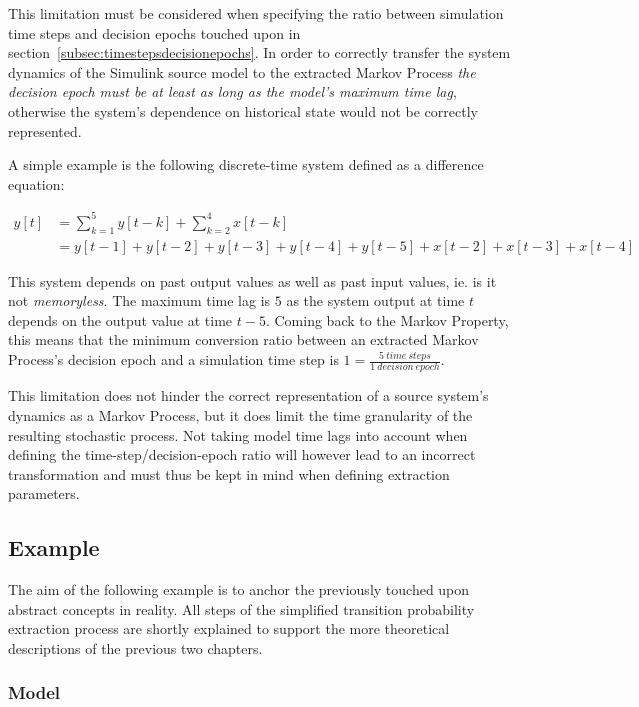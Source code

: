 This limitation must be considered when specifying the ratio between simulation time steps and decision epochs touched upon in section~\ref{subsec:timestepsdecisionepochs}. In order to correctly transfer the system dynamics of the Simulink source model to the extracted Markov Process \textit{the decision epoch must be at least as long as the model's maximum time lag}, otherwise the system's dependence on historical state would not be correctly represented.

A simple example is the following discrete-time system defined as a difference equation:

\begin{align}
y[t] &= \sum_{k=1}^{5} y[t-k] + \sum_{k=2}^{4} x[t-k] \nonumber \\
     &= y[t-1] + y[t-2] + y[t-3] + y[t-4] + y[t-5] + x[t-2] + x[t-3] + x[t-4] \nonumber
\end{align}     

This system depends on past output values as well as past input values, ie. is it not \textit{memoryless}. The maximum time lag is $5$ as the system output at time $t$ depends on the output value at time $t-5$. Coming back to the Markov Property, this means that the minimum conversion ratio between an extracted Markov Process's decision epoch and a simulation time step is $1=\frac{5\ time\ steps}{1\ decision\ epoch}$.

This limitation does not hinder the correct representation of a source system's dynamics as a Markov Process, but it does limit the time granularity of the resulting stochastic process. Not taking model time lags into account when defining the time-step/decision-epoch ratio will however lead to an incorrect transformation and must thus be kept in mind when defining extraction parameters.

\subsection{Example}
\label{subsec:extractexample}

The aim of the following example is to anchor the previously touched upon abstract concepts in reality. All steps of the simplified transition probability extraction process are shortly explained to support the more theoretical descriptions of the previous two chapters.

\subsubsection{Model}


